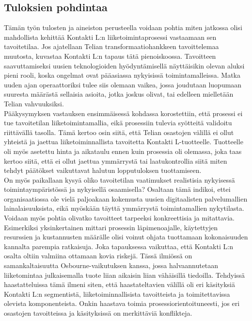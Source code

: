 \documentclass[finnish,12pt,a4paper,pdftex]{article}
\begin{document}


\subsection{Tuloksien pohdintaa}

Tämän työn tulosten ja aineiston perusteella voidaan pohtia miten jatkossa olisi mahdollista kehittää Kontakti L:n liiketoimintaprosessi vastaamaan sen tavoitetilaa. Jos ajatellaan Telian transformaatiohankkeen tavoittelemaa muutosta, kuvastaa Kontakti L:n tapaus tätä pienoiskoossa. Tavoitteen saavuttamiseksi uusien teknologioiden hyödyntämisellä näyttäisikin olevan aluksi pieni rooli, koska ongelmat ovat pääasiassa nykyisissä toimintamalleissa. Matka uuden ajan operaattoriksi tulee siis olemaan vaikea, jossa joudutaan luopumaan suuresta määrästä sellaisia asioita, jotka joskus olivat, tai edelleen mielletään Telian vahvuuksiksi. \\

Pääkysymyksen vastauksen ensimmäisessä kohdassa korostettiin, että prosessi ei tue tavoitetilan liiketoimintamallia, eikä prosessiin tulevia syötteitä validoitu riittävällä tasolla. Tämä kertoo osin siitä, että Telian osastojen välillä ei ollut yhteistä ja jaettua liiketoiminnallista tavoitetta Kontakti L-tuotteelle. Tuotteelle oli myös asetettu hinta ja aikataulu ennen kuin prosessia oli olemassa, joka taas kertoo siitä, että ei ollut jaettua ymmärrystä tai laatukontrollia siitä miten tehdyt päätökset vaikuttavat halutun lopputuloksen tuottamiseen. \\

\noindent On myös paikallaan kysyä oliko tavoitetilan vaatimukset realistisia nykyisessä toimintaympäristössä ja nykyisellä osaamisella? Osaltaan tämä indikoi, ettei organisaatiossa ole vielä paljoakaan kokemusta uusien digitaalisten palvelumallien lainalaisuuksista, eikä myöskään täyttä ymmärrystä toimintamallien nykytilasta. Voidaan myös pohtia olivatko tavoitteet tarpeeksi konkreettisia ja mitattavia. Esimerkiksi yksinkertainen mittari prosessin läpimenoajalle, käytettyjen resurssien ja kustannusten määrälle olisi voinut ohjata tuottamaan kokonaisuuden kannalta parempia ratkaisuja. Joka tapauksessa vaikuttaa, että Kontakti L:n osalta oltiin valmiina ottamaan kovia riskejä. Tässä ilmiössä on samankaltaisuutta Osbourne-vaikutuksen kanssa, jossa halvaannutetaan liiketomintaa julkaisemalla tuote liian aikaisin liian vähäisillä tiedoilla. Tehdyissä haastatteluissa tämä ilmeni siten, että haastateltavien välillä oli eri käsityksiä Kontakti L:n segmentistä, liiketoiminnallisista tavoitteista ja toimitettavissa olevista komponenteista. Onkin haastava toimia prosessiorientoituneesti, jos eri osastojen tavoitteissa ja käsityksissä on merkittäviä konflikteja.\\
\end{document}
